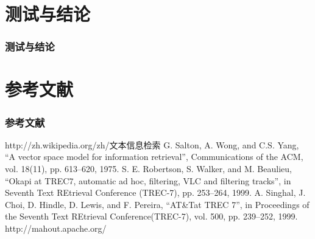 \documentclass[CJKutf8, table, handout]{beamer}
\begin{document}
\begin{CJK}{UTF8}{gbsn}
\begin{frame}
\end{frame}

\section{测试与结论}
\begin{frame}
  \frametitle{测试与结论}
\end{frame}

\section{参考文献}
\begin{frame}
  \frametitle{参考文献}
  \begin{thebibliography}{99}
    http://zh.wikipedia.org/zh/文本信息检索
    G. Salton, A. Wong, and C.S. Yang, “A
      vector space model for information retrieval”, Communications of the ACM,
      vol. 18(11), pp. 613–620, 1975.
    S. E. Robertson, S. Walker, and M.
      Beaulieu, “Okapi at TREC7, automatic ad hoc, filtering, VLC and filtering
      tracks”, in Seventh Text REtrieval Conference (TREC-7), pp. 253–264, 1999.
    A. Singhal, J. Choi, D. Hindle, D. Lewis,
      and F. Pereira, “AT\&Tat TREC 7”, in Proceedings of the Seventh Text
      REtrieval Conference(TREC-7), vol. 500, pp. 239–252, 1999.
    http://mahout.apache.org/
  \end{thebibliography}
\end{frame}

\end{CJK}
\end{document}
